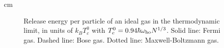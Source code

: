  cm

\begin{figure}[t]
\epsfysize=8cm
\hspace{3cm}
\caption{ Release energy per particle of an ideal gas in the thermodynamic 
limit, in units of $k_B T_c^0$ with $T_c^0 =  0.94  \hbar \omega_{\rm ho} 
N^{1/3}$. Solid line: Fermi gas. Dashed line: Bose gas. Dotted line: 
Maxwell-Boltzmann gas.  }
\label{fig:fermions}
\end{figure}








